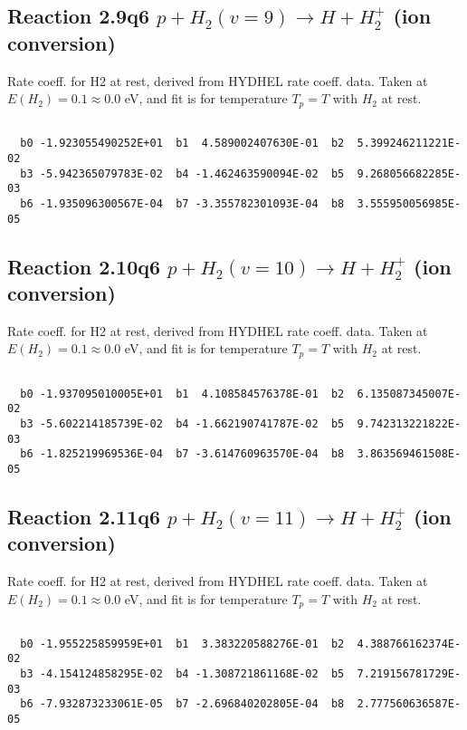 \newpage
\subsection{
Reaction 2.9q6
$ p + H_2(v=9) \rightarrow H + H_2^+$ (ion conversion)
}
Rate coeff. for H2 at rest, derived from HYDHEL rate coeff. data.
Taken at $E(H_2) = 0.1 \approx 0.0$ eV,  and fit is for temperature $T_p=T$ with $H_2$ at rest.

\begin{small}\begin{verbatim}

  b0 -1.923055490252E+01  b1  4.589002407630E-01  b2  5.399246211221E-02
  b3 -5.942365079783E-02  b4 -1.462463590094E-02  b5  9.268056682285E-03
  b6 -1.935096300567E-04  b7 -3.355782301093E-04  b8  3.555950056985E-05

\end{verbatim}\end{small}

\newpage
\subsection{
Reaction 2.10q6
$ p + H_2(v=10) \rightarrow H + H_2^+$ (ion conversion)
}
Rate coeff. for H2 at rest, derived from HYDHEL rate coeff. data.
Taken at $E(H_2) = 0.1 \approx 0.0$ eV,  and fit is for temperature $T_p=T$ with $H_2$ at rest.

\begin{small}\begin{verbatim}

  b0 -1.937095010005E+01  b1  4.108584576378E-01  b2  6.135087345007E-02
  b3 -5.602214185739E-02  b4 -1.662190741787E-02  b5  9.742313221822E-03
  b6 -1.825219969536E-04  b7 -3.614760963570E-04  b8  3.863569461508E-05

\end{verbatim}\end{small}

\newpage
\subsection{
Reaction 2.11q6
$ p + H_2(v=11) \rightarrow H + H_2^+$ (ion conversion)
}
Rate coeff. for H2 at rest, derived from HYDHEL rate coeff. data.
Taken at $E(H_2) = 0.1 \approx 0.0$ eV,  and fit is for temperature $T_p=T$ with $H_2$ at rest.

\begin{small}\begin{verbatim}

  b0 -1.955225859959E+01  b1  3.383220588276E-01  b2  4.388766162374E-02
  b3 -4.154124858295E-02  b4 -1.308721861168E-02  b5  7.219156781729E-03
  b6 -7.932873233061E-05  b7 -2.696840202805E-04  b8  2.777560636587E-05

\end{verbatim}\end{small}

